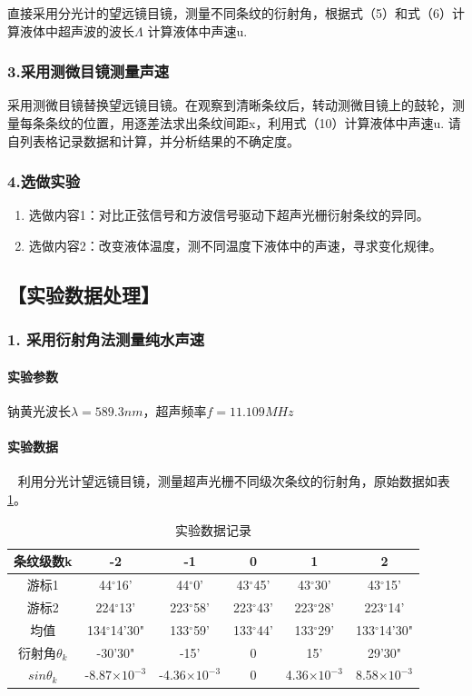 \documentclass[12pt,a4paper,UTF8]{ctexart}
\begin{document}
直接采用分光计的望远镜目镜，测量不同条纹的衍射角，根据式（5）和式（6）计算液体中超声波的波长$\varLambda$ 计算液体中声速u.
\subsubsection*{3.采用测微目镜测量声速}

采用测微目镜替换望远镜目镜。在观察到清晰条纹后，转动测微目镜上的鼓轮，测量每条条纹的位置，用逐差法求出条纹间距x，利用式（10）计算液体中声速u.
请自列表格记录数据和计算，并分析结果的不确定度。

\subsubsection*{4.选做实验}
    \begin{enumerate}
		\item 选做内容1：对比正弦信号和方波信号驱动下超声光栅衍射条纹的异同。
		\item 选做内容2：改变液体温度，测不同温度下液体中的声速，寻求变化规律。		
	\end{enumerate}

\subsection*{【实验数据处理】}

\subsubsection*{1. 采用衍射角法测量纯水声速}
		\paragraph{实验参数} 钠黄光波长$\lambda = 589.3 nm$，超声频率$f = 11.109 MHz$
		\paragraph{实验数据}~
		\newline
		\indent
		利用分光计望远镜目镜，测量超声光栅不同级次条纹的衍射角，原始数据如表\ref{tab:1}。

\begin{table}[htbp]
	\centering
	\caption{实验数据记录}
	\begin{tabular}{cccccc}
	\toprule
	条纹级数k    & -2 & -1  & 0 & 1 & 2 \\
	\midrule
	游标1     & 44$^{\circ}$16' & 44$^{\circ}$0' & 43$^{\circ}$45'&  43$^{\circ}$30'   & 43$^{\circ}$15'\\
	游标2     & 224$^{\circ}$13' & 223$^{\circ}$58' & 223$^{\circ}$43' & 223$^{\circ}$28' & 223$^{\circ}$14' \\
	均值      & 134$^{\circ}$14'30" & 133$^{\circ}$59' & 133$^{\circ}$44' & 133$^{\circ}$29' & 133$^{\circ}$14'30"\\
	衍射角$\theta_k$    & -30'30" & -15' & 0 & 15' & 29'30" \\
	$sin\theta_k$    &   -8.87$\times 10^{-3}$ & -4.36$\times 10^{-3}$ & 0 &4.36$\times 10^{-3}$ & 8.58$\times 10^{-3}$ \\
	\bottomrule
	\end{tabular}%
	\label{tab:1}%
\end{table}%
\end{document}
